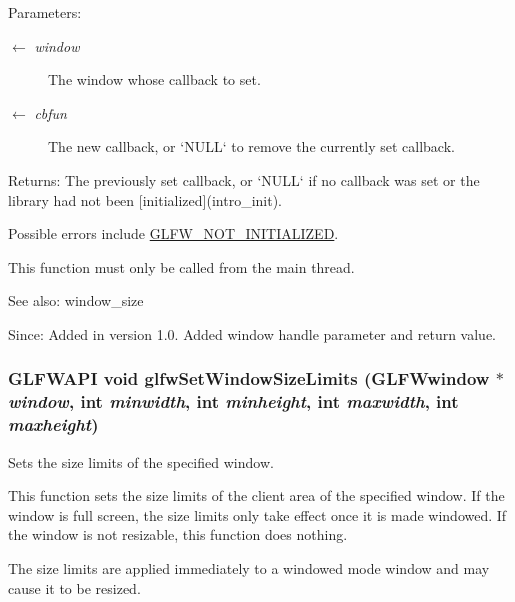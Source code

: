 \begin{Desc}
\item[Parameters:]
\begin{description}
\item[\mbox{$\leftarrow$} {\em window}]The window whose callback to set. \item[\mbox{$\leftarrow$} {\em cbfun}]The new callback, or `NULL` to remove the currently set callback. \end{description}
\end{Desc}
\begin{Desc}
\item[Returns:]The previously set callback, or `NULL` if no callback was set or the library had not been \mbox{[}initialized\mbox{]}(intro\_\-init).\end{Desc}
Possible errors include \hyperlink{group__errors_g2374ee02c177f12e1fa76ff3ed15e14a}{GLFW\_\-NOT\_\-INITIALIZED}.

This function must only be called from the main thread.

\begin{Desc}
\item[See also:]window\_\-size\end{Desc}
\begin{Desc}
\item[Since:]Added in version 1.0.  Added window handle parameter and return value. \end{Desc}
\hypertarget{group__window_g8af814fc98d786d1de2505b40b707de8}{
\subsubsection[glfwSetWindowSizeLimits]{\setlength{\rightskip}{0pt plus 5cm}GLFWAPI void glfwSetWindowSizeLimits ({\bf GLFWwindow} $\ast$ {\em window}, \/  int {\em minwidth}, \/  int {\em minheight}, \/  int {\em maxwidth}, \/  int {\em maxheight})}}
\label{group__window_g8af814fc98d786d1de2505b40b707de8}


Sets the size limits of the specified window. 

This function sets the size limits of the client area of the specified window. If the window is full screen, the size limits only take effect once it is made windowed. If the window is not resizable, this function does nothing.

The size limits are applied immediately to a windowed mode window and may cause it to be resized.


